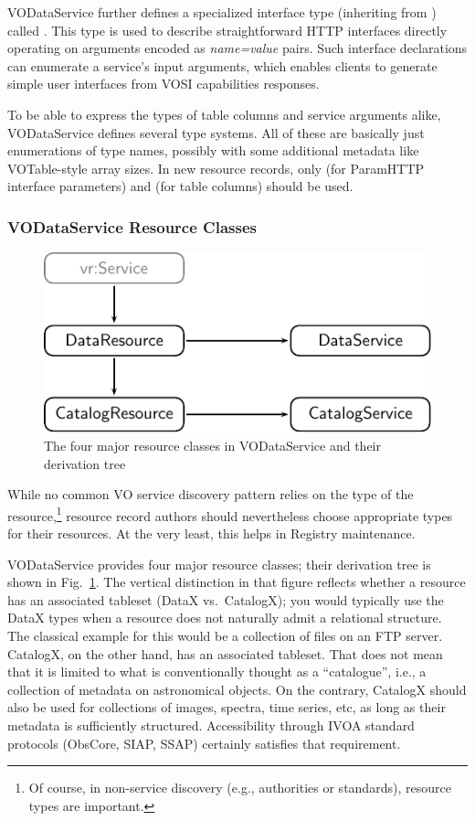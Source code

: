 \documentclass[11pt,a4paper]{ivoa}
\begin{document}
VODataService further defines a specialized interface type
(inheriting from ) called
.  This type is used to describe
straightforward HTTP interfaces directly operating on
arguments encoded as
\emph{name=value} pairs.  Such interface declarations can
enumerate a service's input arguments, which enables clients
to generate simple
user interfaces from VOSI capabilities responses.

To be able to express the types of table columns and service arguments
alike, VODataService defines several type systems.  All of these are
basically just enumerations of type names, possibly with some additional
metadata like VOTable-style array sizes.  In new resource records, only
 (for ParamHTTP interface parameters) and
 (for table columns) should be used.

\subsubsection{VODataService Resource Classes}

\begin{figure}
\includegraphics{resclasses.pdf}
\caption{The four major resource classes in VODataService and their
derivation tree}
\label{fig:rescls}
\end{figure}

While no common VO service discovery pattern relies on the type  of the
resource,\footnote{Of course, in non-service discovery (e.g., authorities
or standards), resource types are important.} resource
record authors should
nevertheless choose appropriate types for their resources.  At the
very least, this helps in Registry maintenance.

VODataService provides four major resource classes; their derivation
tree is shown in Fig.~\ref{fig:rescls}.  The vertical distinction in
that figure reflects whether a resource has an associated tableset
(DataX vs.~CatalogX); you would typically use the DataX types when a
resource does not naturally admit a relational structure.  The classical
example for this would be a collection of files on an FTP server.  CatalogX,
on the other hand, has an associated tableset.  That does not mean that
it is limited to what is conventionally thought as a ``catalogue'',
i.e., a collection of metadata on astronomical objects.  On the
contrary, CatalogX should also be used for collections of images,
spectra, time series, etc, as long as their metadata is sufficiently
structured.  Accessibility through IVOA standard protocols (ObsCore,
SIAP, SSAP) certainly satisfies that requirement.
\end{document}
